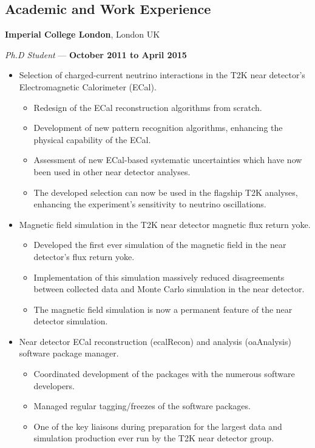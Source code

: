 \documentclass[margin,line]{res}
\begin{document}
\begin{resume}
\section{\sc Academic and Work Experience}
{\bf Imperial College London}, London UK

\vspace{-.3cm}
{\em Ph.D Student} --- {\bf October 2011 to April 2015}%
\begin{itemize}
\item Selection of charged-current neutrino interactions in the T2K near detector's Electromagnetic Calorimeter (ECal).
\begin{itemize}
\item Redesign of the ECal reconstruction algorithms from scratch.
\item Development of new pattern recognition algorithms, enhancing the physical capability of the ECal.
\item Assessment of new ECal-based systematic uncertainties which have now been used in other near detector analyses.
\item The developed selection can now be used in the flagship T2K analyses, enhancing the experiment's sensitivity to neutrino oscillations.
\end{itemize}
\item Magnetic field simulation in the T2K near detector magnetic flux return yoke.
\begin{itemize}
\item Developed the first ever simulation of the magnetic field in the near detector's flux return yoke.
\item Implementation of this simulation massively reduced disagreements between collected data and Monte Carlo simulation in the near detector.
\item The magnetic field simulation is now a permanent feature of the near detector simulation.
\end{itemize}
\item Near detector ECal reconstruction (ecalRecon) and analysis (oaAnalysis) software package manager.
\begin{itemize}
\item Coordinated development of the packages with the numerous software developers.
\item Managed regular tagging/freezes of the software packages.
\item One of the key liaisons during preparation for the largest data and simulation production ever run by the T2K near detector group.
\end{itemize}
\end{itemize}


\end{resume}
\end{document}

